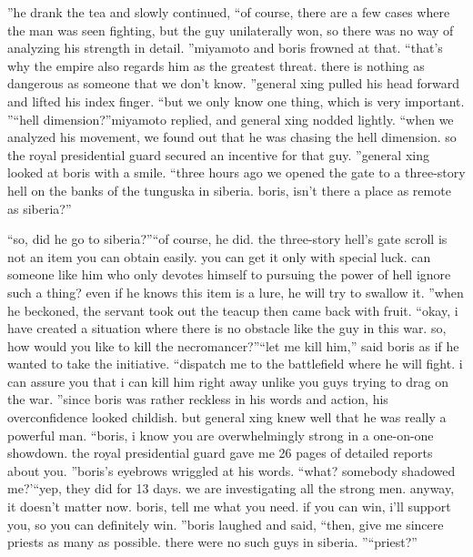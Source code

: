 ”he drank the tea and slowly continued, “of course, there are a few cases where the man was seen fighting, but the guy unilaterally won, so there was no way of analyzing his strength in detail.
”miyamoto and boris frowned at that.
“that’s why the empire also regards him as the greatest threat.
 there is nothing as dangerous as someone that we don’t know.
”general xing pulled his head forward and lifted his index finger.
“but we only know one thing, which is very important.
”“hell dimension?”miyamoto replied, and general xing nodded lightly.
“when we analyzed his movement, we found out that he was chasing the hell dimension.
 so the royal presidential guard secured an incentive for that guy.
”general xing looked at boris with a smile.
“three hours ago we opened the gate to a three-story hell on the banks of the tunguska in siberia.
 boris, isn’t there a place as remote as siberia?”

“so, did he go to siberia?”“of course, he did.
 the three-story hell’s gate scroll is not an item you can obtain easily.
 you can get it only with special luck.
 can someone like him who only devotes himself to pursuing the power of hell ignore such a thing? even if he knows this item is a lure, he will try to swallow it.
”when he beckoned, the servant took out the teacup then came back with fruit.
“okay, i have created a situation where there is no obstacle like the guy in this war.
 so, how would you like to kill the necromancer?”“let me kill him,” said boris as if he wanted to take the initiative.
“dispatch me to the battlefield where he will fight.
 i can assure you that i can kill him right away unlike you guys trying to drag on the war.
”since boris was rather reckless in his words and action, his overconfidence looked childish.
but general xing knew well that he was really a powerful man.
“boris, i know you are overwhelmingly strong in a one-on-one showdown.
 the royal presidential guard gave me 26 pages of detailed reports about you.
”boris’s eyebrows wriggled at his words.
“what? somebody shadowed me?’“yep, they did for 13 days.
 we are investigating all the strong men.
 anyway, it doesn’t matter now.
 boris, tell me what you need.
 if you can win, i’ll support you, so you can definitely win.
”boris laughed and said, “then, give me sincere priests as many as possible.
 there were no such guys in siberia.
”“priest?”

 